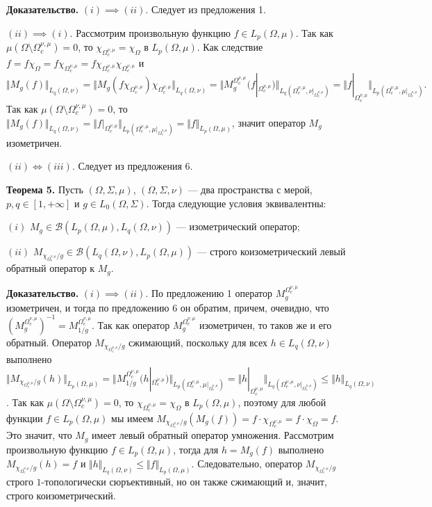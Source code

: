 \documentclass[11pt,twoside]{article}
\begin{document}
\textbf{Доказательство.} $(i)$$\implies$$ (ii)$. Следует из предложения
1.

$(ii)$$\implies$$ (i)$. Рассмотрим произвольную функцию $f\in
L_p(\Omega,\mu)$. Так как $\mu(\Omega\setminus\Omega_c^{\nu,\mu})=0$, то
$\chi_{\Omega_c^{\nu,\mu}}=\chi_{\Omega}$ в $L_p(\Omega,\mu)$. Как
следствие $f=f\chi_{\Omega}
=f\chi_{\Omega_c^{\nu,\mu}}
=f\chi_{\Omega_c^{\nu,\mu}}\chi_{\Omega_c^{\nu,\mu}}$
и
$$
    \Vert M_g(f)\Vert_{L_q(\Omega,\nu)}
    =\Vert
    M_g(f\chi_{\Omega_c^{\nu,\mu}})\chi_{\Omega_c^{\nu,\mu}}
    \Vert_{L_q(\Omega,\nu)}
    =\Vert M_g^{\Omega_c^{\nu,\mu}}(f|_{\Omega_c^{\nu,\mu}})
    \Vert_{L_q(\Omega_c^{\nu,\mu},\nu|_{\Omega_c^{\nu,\mu}})}
    =\Vert
    f|_{\Omega_c^{\nu,\mu}}
    \Vert_{L_p(\Omega_c^{\nu,\mu},\mu|_{\Omega_c^{\nu,\mu}})}.
$$
Так как $\mu(\Omega\setminus\Omega_c^{\nu,\mu})=0$, то $\Vert
M_g(f)\Vert_{L_q(\Omega,\nu)}= \Vert f|_{\Omega_c^{\nu,\mu}}
\Vert_{L_p(\Omega_c^{\nu,\mu},\mu|_{\Omega_c^{\nu,\mu}})}=\Vert
f\Vert_{L_p(\Omega,\mu)}$, значит оператор $M_g$ изометричен.

$(ii)\Longleftrightarrow (iii)$. Следует из предложения 6.

\textbf{Теорема 5.} Пусть $(\Omega,\Sigma,\mu)$, $(\Omega,\Sigma,\nu)$ --- два
пространства с мерой, $p,q\in[1,+\infty]$ и $g\in L_0(\Omega,\Sigma)$. Тогда
следующие условия эквивалентны:

$(i)$ $M_g\in\mathcal{B}(L_p(\Omega,\mu),L_q(\Omega,\nu))$ --- изометрический
оператор;

$(ii)$ $M_{\chi_{\Omega_c^{\nu,\mu}}/g}\in\mathcal{B}(L_q(\Omega,\nu),
L_p(\Omega,\mu))$ --- строго коизометрический левый обратный оператор к
$M_g$.


\textbf{Доказательство.} $(i)$$\implies$$ (ii)$. По предложению 1 оператор
$M_g^{\Omega_c^{\nu,\mu}}$ изометричен, и тогда по предложению 6 он обратим,
причем, очевидно, что
${(M_g^{\Omega_c^{\nu,\mu}})}^{-1}=M_{1/g}^{\Omega_c^{\nu,\mu}}$. Так как
оператор $M_g^{\Omega_c^{\nu,\mu}}$ изометричен, то таков же и его обратный.
Оператор $M_{\chi_{\Omega_c^{\nu,\mu}}/g}$ сжимающий, поскольку для всех
$h\in L_q(\Omega,\nu)$ выполнено $\Vert
M_{\chi_{\Omega_c^{\nu,\mu}}/g}(h)\Vert_{L_p(\Omega,\mu)} = \Vert
M_{1/g}^{\Omega_c^{\nu,\mu}}(h|_{\Omega_c^{\nu,\mu}})
\Vert_{L_p(\Omega_c^{\nu,\mu},\mu|_{\Omega_c^{\nu,\mu}})} =\Vert
h|_{\Omega_c^{\nu,\mu}}
\Vert_{L_q(\Omega_c^{\nu,\mu},\nu|_{\Omega_c^{\nu,\mu}})} \leq \Vert h
\Vert_{L_q(\Omega,\nu)}$. Так как
$\mu(\Omega\setminus\Omega_c^{\nu,\mu})=0$, то
$\chi_{\Omega_c^{\nu,\mu}}=\chi_{\Omega}$ в $L_p(\Omega,\mu)$, поэтому для
любой функции $f\in L_p(\Omega,\mu)$ мы имеем
$M_{\chi_{\Omega_c^{\nu,\mu}}/g}(M_g(f))
=f\cdot\chi_{\Omega_c^{\nu,\mu}}=f\cdot\chi_{\Omega}=f$. Это значит, что
$M_g$ имеет левый обратный оператор умножения. Рассмотрим произвольную
функцию $f\in L_p(\Omega,\mu)$, тогда для $h=M_g(f)$ выполнено
$M_{\chi_{\Omega_c^{\nu,\mu}}/g}(h)=f$ и $\Vert
h\Vert_{L_q(\Omega,\nu)}\leq\Vert f\Vert_{L_p(\Omega,\mu)}$. Следовательно,
оператор $M_{\chi_{\Omega_c^{\nu,\mu}}/g}$ строго $1$-топологически
сюръективный, но он также сжимающий и, значит, строго коизометрический.
\end{document}
